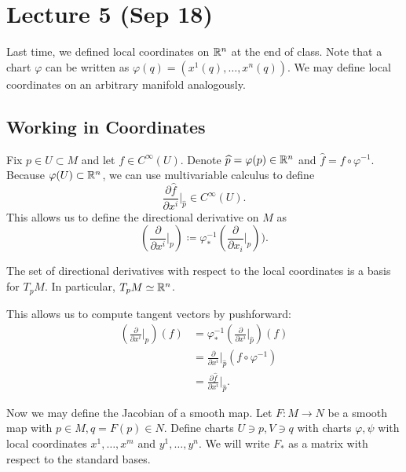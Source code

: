 \documentclass[twoside, 10pt]{article}
\begin{document}
    \section{Lecture 5 (Sep 18)}%
    \label{sec:lecture_5_sep_18_}
    
    Last time, we defined local coordinates on $\mathbb{R}^n$ at the end of class. Note that a chart $\varphi$ can be written as $\varphi(q) = (x^1(q), \ldots, x^n(q))$. We may define local coordinates on an arbitrary manifold analogously.

    \subsection{Working in Coordinates}%
    \label{sub:working_in_coordinates}
    
    Fix $p \in U \subset M$ and let $f \in C^{\infty}(U)$. Denote $\widehat{p} = \varphi(p) \in \mathbb{R}^n$ and $\widehat{f} = f \circ \varphi^{-1}$. Because $\varphi(U) \subset \mathbb{R}^n$, we can use multivariable calculus to define
    \[\frac{\partial \widehat{f}}{\partial x^i}\Bigg\vert_{\widehat{p}} \in C^{\infty}(U).\]
    This allows us to define the directional derivative on $M$ as 
    \[\left(\frac{\partial}{\partial x^i}\bigg\vert_p \right) \coloneqq \varphi^{-1}_* \left( \frac{\partial}{\partial x_i}\bigg\vert_{\widehat{p}} \right)).\]

    \begin{prop}
        The set of directional derivatives with respect to the local coordinates is a basis for $T_pM$. In particular, $T_pM \simeq \mathbb{R}^n$.
    \end{prop}

    This allows us to compute tangent vectors by pushforward:
    \begin{align*}
    \left( \frac{\partial}{\partial x^i} \bigg\vert_p \right)(f) &= \varphi^{-1}_* \left( \frac{\partial}{\partial x^i} \bigg\vert_{\widehat{p}} \right)(f) \\
    &= \frac{\partial}{\partial x^i} \bigg\vert_{\widehat{p}} (f \circ \varphi^{-1}) \\
    &= \frac{\partial \widehat{f}}{\partial x^i} \bigg\vert_{\widehat{p}}.
    \end{align*}

    Now we may define the Jacobian of a smooth map.
    Let $F:M \to N$ be a smooth map with $p \in M, q = F(p) \in N$. Define charts $U \ni p, V \ni q$ with charts $\varphi, \psi$ with local coordinates $x^1, \ldots, x^m$ and $y^1, \ldots, y^n$. We will write $F_*$ as a matrix with respect to the standard bases.
    
\end{document}
